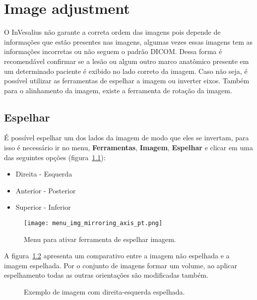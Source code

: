 \chapter{Image adjustment}

O InVesalius não garante a correta ordem das imagens pois depende de informações que estão presentes nas imagens, algumas vezes essas imagens tem as informações incorretas ou não seguem o padrão DICOM. Dessa forma é recomendável confirmar se a lesão ou algum outro marco anatômico presente em um determinado paciente é exibido no lado correto da imagem. Caso não seja, é possível utilizar as ferramentas de espelhar a imagem ou inverter eixos. Também para o alinhamento da imagem, existe a ferramenta de rotação da imagem.

\section{Espelhar}

É possível espelhar um dos lados da imagem de modo que eles se invertam, para isso é necessário ir no menu, \textbf{Ferramentas}, \textbf{Imagem}, \textbf{Espelhar} e clicar em uma das seguintes opções (figura~\ref{fig:menu_img_mirroring_axis_pt}):

\begin{itemize}
	\item Direita - Esquerda
	\item Anterior - Posterior
	\item Superior - Inferior
\end{itemize}

\begin{figure}[!htb]
\centering
\texttt{[image: menu\_img\_mirroring\_axis\_pt.png]}
\caption{Menu para ativar ferramenta de espelhar imagem.}
\label{fig:menu_img_mirroring_axis_pt}
\end{figure}


A figura~\ref{fig:mirrored} apresenta um comparativo entre a imagem não espelhada e a imagem espelhada. Por o conjunto de imagens formar um volume, ao aplicar espelhamento todas as outras orientações são modificadas também.

\begin{figure}[!htb]
  \centering
    \qquad
  \hfill
  \caption{Exemplo de imagem com direita-esquerda espelhada.}
  \label{fig:mirrored}
\end{figure}

